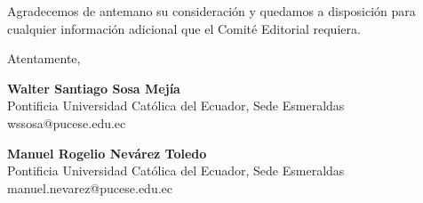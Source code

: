 \documentclass[12pt]{article}
\begin{document}
\vspace{0.8cm}

\noindent Agradecemos de antemano su consideraci\'on y quedamos a disposici\'on para cualquier informaci\'on adicional que el Comit\'e Editorial requiera.

\vspace{0.5cm}

\noindent Atentamente,

\vspace{0.5cm}

\noindent
\textbf{Walter Santiago Sosa Mej\'ia} \\
Pontificia Universidad Cat\'olica del Ecuador, Sede Esmeraldas \\
wssosa@pucese.edu.ec

\vspace{0.3cm}

\noindent
\textbf{Manuel Rogelio Nev\'arez Toledo} \\
Pontificia Universidad Cat\'olica del Ecuador, Sede Esmeraldas \\
manuel.nevarez@pucese.edu.ec
\end{document}
